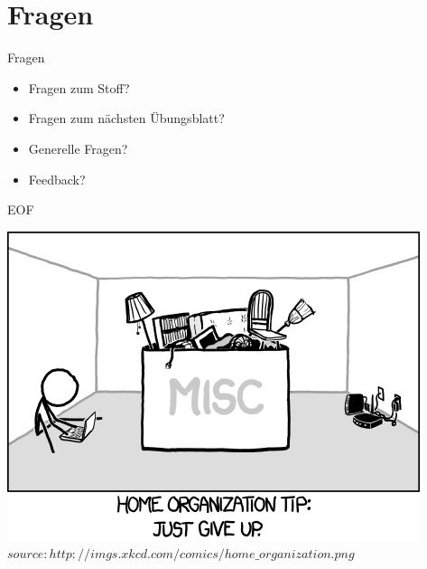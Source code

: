 	\section{Fragen}
	\begin{frame} {Fragen}
		\begin{itemize}
			\item Fragen zum Stoff?
			\item Fragen zum n\"achsten \"Ubungsblatt?
			\item Generelle Fragen?
			\item Feedback?
		\end{itemize}
	\end{frame}

		
	\begin{frame} {EOF}
		\begin{center}
			\includegraphics[scale=0.5]{graphics/eof5.png}\\
			\tiny $source: http://imgs.xkcd.com/comics/home\_organization.png$
		\end{center}
	\end{frame}


